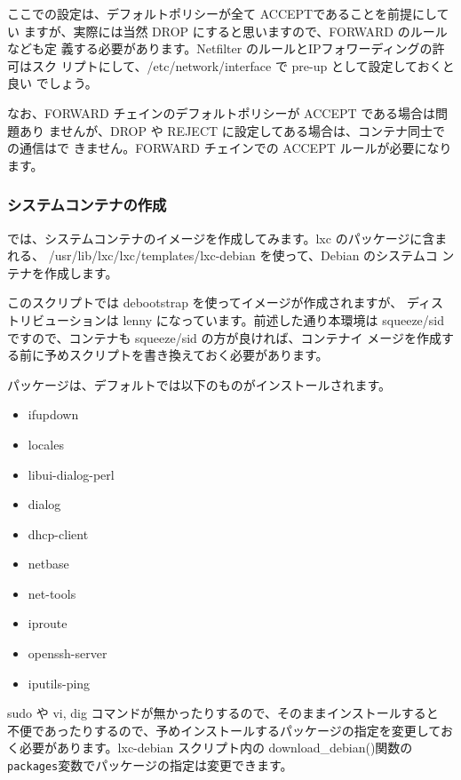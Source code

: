 \documentclass[mingoth,a4paper]{jsarticle}
\begin{document}
ここでの設定は、デフォルトポリシーが全て ACCEPTであることを前提にしてい
ますが、実際には当然 DROP にすると思いますので、FORWARD のルールなども定
義する必要があります。Netfilter のルールとIPフォワーディングの許可はスク
リプトにして、/etc/network/interface で pre-up として設定しておくと良い
でしょう。

なお、FORWARD チェインのデフォルトポリシーが ACCEPT である場合は問題あり
ませんが、DROP や REJECT に設定してある場合は、コンテナ同士での通信はで
きません。FORWARD チェインでの ACCEPT ルールが必要になります。

\subsubsection{システムコンテナの作成}
\label{sec:make_container}

では、システムコンテナのイメージを作成してみます。lxc のパッケージに含まれる、
/usr/lib/lxc/lxc/templates/lxc-debian を使って、Debian のシステムコ
ンテナを作成します。

このスクリプトでは debootstrap を使ってイメージが作成されますが、
ディストリビューションは lenny になっています。前述した通り本環境は
squeeze/sid ですので、コンテナも squeeze/sid の方が良ければ、コンテナイ
メージを作成する前に予めスクリプトを書き換えておく必要があります。

パッケージは、デフォルトでは以下のものがインストールされます。
\begin{itemize}
 \item ifupdown
 \item locales
 \item libui-dialog-perl
 \item dialog
 \item dhcp-client
 \item netbase
 \item net-tools
 \item iproute
 \item openssh-server
 \item iputils-ping
\end{itemize}

sudo や vi, dig コマンドが無かったりするので、そのままインストールすると
不便であったりするので、予めインストールするパッケージの指定を変更してお
く必要があります。lxc-debian スクリプト内の download\_debian()関数の
\verb/packages/変数でパッケージの指定は変更できます。

\end{document}
